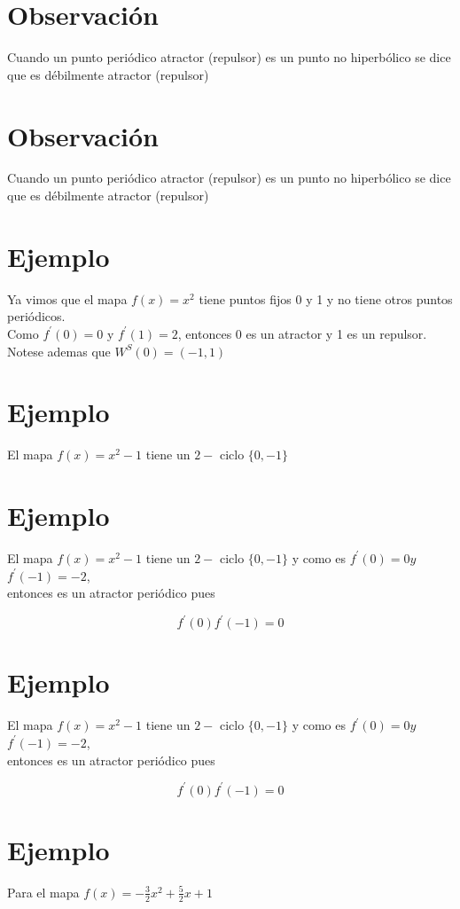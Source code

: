 \documentclass[11pt]{beamer}
\begin{document}
\section*{Observación}
Cuando un punto periódico atractor (repulsor) es un punto no hiperbólico se dice que es débilmente atractor (repulsor)

\section*{Observación}
Cuando un punto periódico atractor (repulsor) es un punto no hiperbólico se dice que es débilmente atractor (repulsor)

\section*{Ejemplo}
Ya vimos que el mapa $f(x)=x^{2}$ tiene puntos fijos 0 y 1 y no tiene otros puntos periódicos.\\
Como $f^{\prime}(0)=0$ y $f^{\prime}(1)=2$, entonces 0 es un atractor y 1 es un repulsor. Notese ademas que $W^{S}(0)=(-1,1)$

\section*{Ejemplo}
El mapa $f(x)=x^{2}-1$ tiene un $2-$ ciclo $\{0,-1\}$

\section*{Ejemplo}
El mapa $f(x)=x^{2}-1$ tiene un $2-$ ciclo $\{0,-1\}$ y como es $f^{\prime}(0)=0 y$ $f^{\prime}(-1)=-2$,\\
entonces es un atractor periódico pues

$$
f^{\prime}(0) f^{\prime}(-1)=0
$$

\section*{Ejemplo}
El mapa $f(x)=x^{2}-1$ tiene un $2-$ ciclo $\{0,-1\}$ y como es $f^{\prime}(0)=0 y$ $f^{\prime}(-1)=-2$,\\
entonces es un atractor periódico pues

$$
f^{\prime}(0) f^{\prime}(-1)=0
$$

\section*{Ejemplo}
Para el mapa $f(x)=-\frac{3}{2} x^{2}+\frac{5}{2} x+1$
\end{document}

